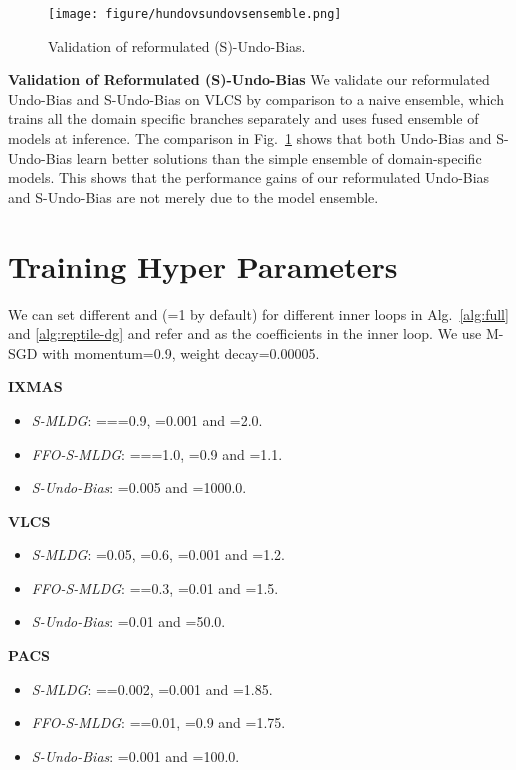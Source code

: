 \documentclass[runningheads]{llncs}
\newcommand{\cut}[1]{}
\newcommand{\nameS}{S-MLDG}
\newcommand{\nameFFS}{FFO-\nameS}
\newcommand{\hundo}{S-Undo-Bias}
\newcommand{\keypoint}[1]{\vspace{0.1cm}\noindent\textbf{#1}\quad}
\begin{document}
\begin{figure}[t]
    \centering
    \centering
    \texttt{[image: figure/hundovsundovsensemble.png]}
\caption{Validation of reformulated (S)-Undo-Bias.}
    \label{fig:hundo-vs-naive}
\end{figure}

\keypoint{Validation of Reformulated (S)-Undo-Bias} We validate our reformulated Undo-Bias and \hundo{} on VLCS by comparison to a naive ensemble, which trains all the domain specific branches separately and uses fused ensemble of models at inference. The comparison in Fig.~\ref{fig:hundo-vs-naive} shows that both Undo-Bias and \hundo{} learn better solutions than the simple ensemble of domain-specific models. This shows that the performance gains of our reformulated Undo-Bias and \hundo{} are not merely due to the model ensemble.


\section{Training Hyper Parameters}

We can set different  and  (=1 by default) for different inner loops in Alg.~\ref{alg:full} and \ref{alg:reptile-dg} and refer  and  as the coefficients in the  inner loop.
We use M-SGD with momentum=0.9, weight decay=0.00005.

\keypoint{IXMAS} 
\begin{itemize}
    \item \emph{\nameS{}}: ===0.9, =0.001 and =2.0.
    \item \emph{\nameFFS{}}: ===1.0, =0.9 and =1.1.
    \item \emph{\hundo}: =0.005 and =1000.0.
\end{itemize}



\keypoint{VLCS} 
\begin{itemize}
    \item \emph{\nameS{}}: =0.05, =0.6, =0.001 and =1.2.
    
    \item \emph{\nameFFS{}}: ==0.3, =0.01 and =1.5.
    
    \item \emph{\hundo}: =0.01 and =50.0.
\end{itemize}

 
\cut{
\keypoint{PACS(A)} 
\begin{itemize}
    \item \emph{\nameS{}}: ==0.001, =0.0005 and =4.0.
     \item \emph{\nameFFS{}}: ==0.005, =0.85 and =1.85.
    \item \emph{\hundo}: =0.001 and =300.0.
\end{itemize}}



\keypoint{PACS} 

\begin{itemize}
    \item \emph{\nameS{}}: ==0.002, =0.001 and =1.85.
    \item \emph{\nameFFS{}}: ==0.01, =0.9 and =1.75.
    \item \emph{\hundo}: =0.001 and =100.0.
\end{itemize}
\end{document}
